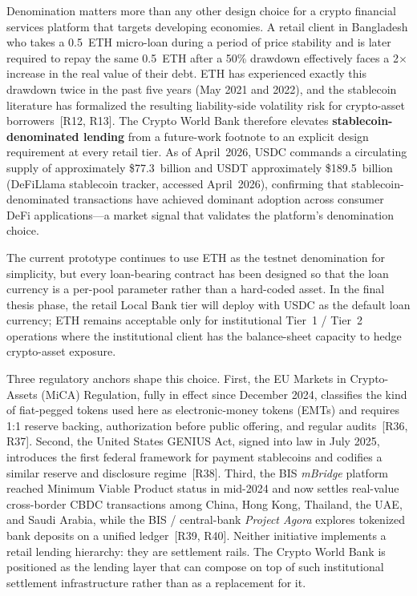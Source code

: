 \documentclass[12pt,a4paper]{report}
\begin{document}
Denomination matters more than any other design choice for a crypto financial services platform that targets developing economies. A retail client in Bangladesh who takes a 0.5~ETH micro-loan during a period of price stability and is later required to repay the same 0.5~ETH after a 50\% drawdown effectively faces a 2$\times$ increase in the real value of their debt. ETH has experienced exactly this drawdown twice in the past five years (May 2021 and 2022), and the stablecoin literature has formalized the resulting liability-side volatility risk for crypto-asset borrowers~[R12, R13]. The Crypto World Bank therefore elevates \textbf{stablecoin-denominated lending} from a future-work footnote to an explicit design requirement at every retail tier. As of April~2026, USDC commands a circulating supply of approximately \$77.3~billion and USDT approximately \$189.5~billion (DeFiLlama stablecoin tracker, accessed April~2026), confirming that stablecoin-denominated transactions have achieved dominant adoption across consumer DeFi applications---a market signal that validates the platform's denomination choice.

The current prototype continues to use ETH as the testnet denomination for simplicity, but every loan-bearing contract has been designed so that the loan currency is a per-pool parameter rather than a hard-coded asset. In the final thesis phase, the retail Local Bank tier will deploy with USDC as the default loan currency; ETH remains acceptable only for institutional Tier~1 / Tier~2 operations where the institutional client has the balance-sheet capacity to hedge crypto-asset exposure.

Three regulatory anchors shape this choice. First, the EU Markets in Crypto-Assets (MiCA) Regulation, fully in effect since December 2024, classifies the kind of fiat-pegged tokens used here as electronic-money tokens (EMTs) and requires 1{:}1 reserve backing, authorization before public offering, and regular audits~[R36, R37]. Second, the United States GENIUS Act, signed into law in July 2025, introduces the first federal framework for payment stablecoins and codifies a similar reserve and disclosure regime~[R38]. Third, the BIS \textit{mBridge} platform reached Minimum Viable Product status in mid-2024 and now settles real-value cross-border CBDC transactions among China, Hong Kong, Thailand, the UAE, and Saudi Arabia, while the BIS / central-bank \textit{Project Agora} explores tokenized bank deposits on a unified ledger~[R39, R40]. Neither initiative implements a retail lending hierarchy: they are settlement rails. The Crypto World Bank is positioned as the lending layer that can compose on top of such institutional settlement infrastructure rather than as a replacement for it.
\end{document}
